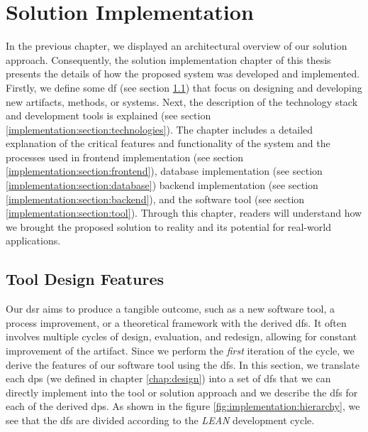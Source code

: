 
\chapter{Solution Implementation}
\label{chap:implementation}
\ifpdf
    \graphicspath{{Chapters/Implementation/Figs/}{Chapters/Implementation/Figs/}{Chapters/Implementation/Figs/}}
\else
    \graphicspath{{Chapters/Implementation/Figs/}{Chapters/Implementation/Figs/}}
\fi
In the previous chapter, we displayed an architectural overview of our solution approach.
Consequently, the solution implementation chapter of this thesis presents the details of how the proposed system was developed and implemented.
Firstly, we define some \ac{df} (see section \ref{implementation:section:designfeatures}) that focus on designing and developing new artifacts, methods, or systems.
Next, the description of the technology stack and development tools is explained (see section \ref{implementation:section:technologies}).
The chapter includes a detailed explanation of the critical features and functionality of the system and the processes used in frontend implementation (see section \ref{implementation:section:frontend}), database implementation (see section \ref{implementation:section:database}) backend implementation (see section \ref{implementation:section:backend}), and the software tool (see section \ref{implementation:section:tool}).
Through this chapter, readers will understand how we brought the proposed solution to reality and its potential for real-world applications.

\section{Tool Design Features}
\label{implementation:section:designfeatures}
Our \ac{dsr} aims to produce a tangible outcome, such as a new software tool, a process improvement, or a theoretical framework with the derived \ac{df}s.
It often involves multiple cycles of design, evaluation, and redesign, allowing for constant improvement of the artifact.
Since we perform the \textit{first} iteration of the cycle, we derive the features of our software tool using the \ac{df}s.
In this section, we translate each \ac{dp}s (we defined in chapter \ref{chap:design}) into a set of \ac{df}s that we can directly implement into the tool or solution approach and we describe the \ac{df}s for each of the derived \ac{dp}s.
As shown in the figure \ref{fig:implementation:hierarchy}, we see that the \ac{df}s are divided according to the \textit{LEAN} development cycle.
\clearpage

